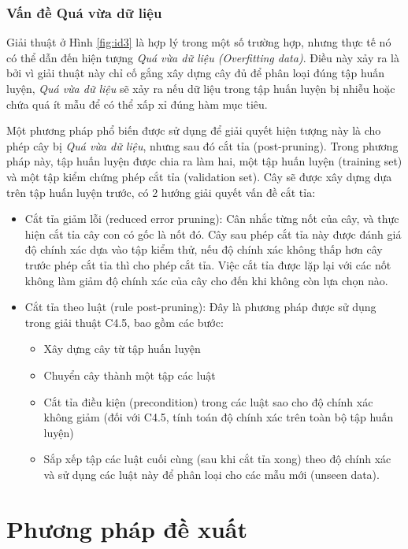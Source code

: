 \documentclass[12pt]{extarticle}
\begin{document}
			\subsubsection*{Vấn đề Quá vừa dữ liệu}
				\par Giải thuật ở Hình \ref{fig:id3} là hợp lý trong một số trường hợp, nhưng thực tế nó có thể dẫn đến hiện tượng \textit{Quá vừa dữ liệu (Overfitting data)}. Điều này xảy ra là bởi vì giải thuật này chỉ cố gắng xây dựng cây đủ để phân loại đúng tập huấn luyện, \textit{Quá vừa dữ liệu} sẽ xảy ra nếu dữ liệu trong tập huấn luyện bị nhiễu hoặc chứa quá ít mẫu để có thể xấp xỉ đúng hàm mục tiêu.
				\par Một phương pháp phổ biến được sử dụng để giải quyết hiện tượng này là cho phép cây bị \textit{Quá vừa dữ liệu}, nhưng sau đó cắt tỉa (post-pruning). Trong phương pháp này, tập huấn luyện được chia ra làm hai, một tập huấn luyện (training set) và một tập kiểm chứng phép cắt tỉa (validation set). Cây sẽ được xây dựng dựa trên tập huấn luyện trước, có 2 hướng giải quyết vấn đề cắt tỉa:
				\begin{itemize}
				\item{Cắt tỉa giảm lỗi (reduced error pruning): Cân nhắc từng nốt của cây, và thực hiện cắt tỉa cây con có gốc là nốt đó. Cây sau phép cắt tỉa này được đánh giá độ chính xác dựa vào tập kiểm thử, nếu độ chính xác không thấp hơn cây trước phép cắt tỉa thì cho phép cắt tỉa. Việc cắt tỉa được lặp lại với các nốt không làm giảm độ chính xác của cây cho đến khi không còn lựa chọn nào.}
				\item{Cắt tỉa theo luật (rule post-pruning): Đây là phương pháp được sử dụng trong giải thuật C4.5, bao gồm các bước:
					\begin{itemize}
						\item{Xây dựng cây từ tập huấn luyện}
						\item{Chuyển cây thành một tập các luật}
						\item{Cắt tỉa điều kiện (precondition) trong các luật sao cho độ chính xác không giảm (đối với C4.5, tính toán độ chính xác trên toàn bộ tập huấn luyện)}
						\item{Sắp xếp tập các luật cuối cùng (sau khi cắt tỉa xong) theo độ chính xác và sử dụng các luật này để phân loại cho các mẫu mới (unseen data).}
					\end{itemize}}				
				\end{itemize}

	\section{Phương pháp đề xuất}
\end{document}

